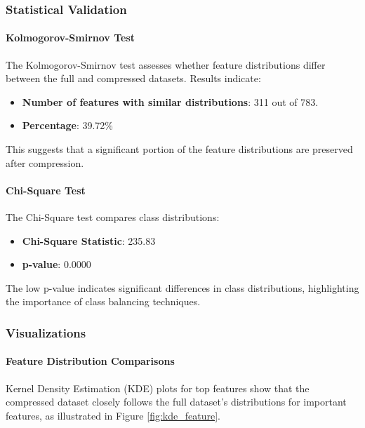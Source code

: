 \documentclass{article}
\begin{document}
\subsubsection{Statistical Validation}

\paragraph{Kolmogorov-Smirnov Test}

The Kolmogorov-Smirnov test assesses whether feature distributions differ between the full and compressed datasets. Results indicate:

\begin{itemize}
    \item \textbf{Number of features with similar distributions}: 311 out of 783.
    \item \textbf{Percentage}: 39.72\%
\end{itemize}

This suggests that a significant portion of the feature distributions are preserved after compression.

\paragraph{Chi-Square Test}

The Chi-Square test compares class distributions:

\begin{itemize}
    \item \textbf{Chi-Square Statistic}: 235.83
    \item \textbf{p-value}: 0.0000
\end{itemize}

The low p-value indicates significant differences in class distributions, highlighting the importance of class balancing techniques.

\subsubsection{Visualizations}

\paragraph{Feature Distribution Comparisons}

Kernel Density Estimation (KDE) plots for top features show that the compressed dataset closely follows the full dataset's distributions for important features, as illustrated in Figure \ref{fig:kde_feature}.
\end{document}
